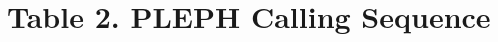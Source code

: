 \documentclass[twoside,11pt,nolof]{starlink}
\begin{document}
\section*{Table 2. PLEPH Calling Sequence}

\end{document}
